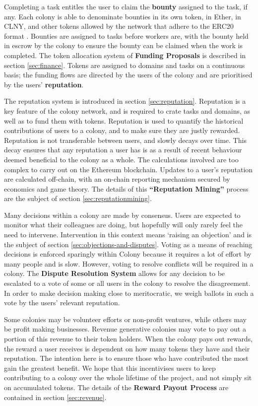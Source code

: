 Completing a task entitles the user to claim the \textbf{bounty} assigned to the task, if any. Each colony is able to denominate bounties in its own token, in Ether, in CLNY, and other tokens allowed by the network that adhere to the ERC20 format \cite{erc20}. Bounties are assigned to tasks before workers are, with the bounty held in escrow by the colony to ensure the bounty can be claimed when the work is completed. The token allocation system of \textbf{Funding Proposals} is described in section \ref{sec:finance}. Tokens are assigned to domains and tasks on a continuous basis; the funding flows are directed by the users of the colony and are prioritised by the users' \textbf{reputation}. 

The reputation system is introduced in section \ref{sec:reputation}. Reputation is a key feature of the colony network, and is required to crate tasks and domains, as well as to fund them with tokens. Reputation is used to quantify the historical contributions of users to a colony, and to make sure they are justly rewarded. Reputation is not transferable between users, and slowly decays over time. This decay ensures that any reputation a user has is as a result of recent behaviour deemed beneficial to the colony as a whole. The calculations involved are too complex to carry out on the Ethereum blockchain. Updates to a user's reputation are calculated off-chain, with an on-chain reporting mechanism secured by economics and game theory. The details of this \textbf{``Reputation Mining''} process are the subject of section \ref{sec:reputationmining}.

Many decisions within a colony are made by consensus. Users are expected to monitor what their colleagues are doing, but hopefully will only rarely feel the need to intervene. Intervention in this context means `raising an objection' and is the subject of section \ref{sec:objections-and-disputes}. Voting as a means of reaching decisions is enforced sparingly within Colony because it requires a lot of effort by many people and is slow. However, voting to resolve conflicts will be required in a colony. The \textbf{Dispute Resolution System} allows for any decision to be escalated to a vote of some or all users in the colony to resolve the disagreement. In order to make decision making close to meritocratic, we weigh ballots in such a vote by the users' relevant reputation.

Some colonies may be volunteer efforts or non-profit ventures, while others may be profit making businesses. Revenue generative colonies may vote to pay out a portion of this revenue to their token holders. When the colony pays out rewards, the reward a user receives is dependent on how many tokens they have and their reputation. The intention here is to ensure those who have contributed the most gain the greatest benefit. We hope that this incentivises users to keep contributing to a colony over the whole lifetime of the project, and not simply sit on accumulated tokens. The details of the \textbf{Reward Payout Process} are contained in section \ref{sec:revenue}.

